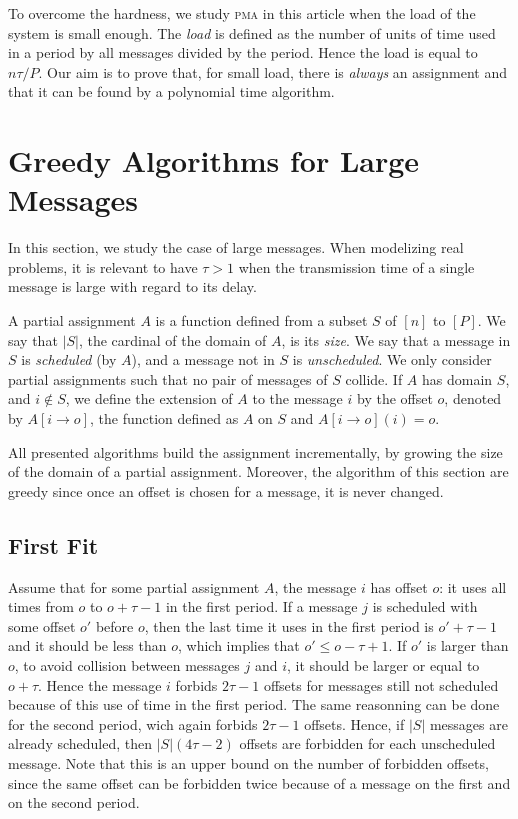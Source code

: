 \documentclass[10pt, conference, letterpaper]{IEEEtran}
\newcommand\pma{\textsc{pma}\xspace}
\begin{document}
To overcome the hardness, we study \pma in this article when the load of the system is small enough. The \emph{load} is defined as the number of units of time used in a period by all messages divided by the period. Hence the load is equal to $n\tau /P$. Our aim is to prove that, for small load, there is \emph{always} an assignment and that it can be found by a polynomial time algorithm.



\section{Greedy Algorithms for Large Messages}

In this section, we study the case of large messages. When modelizing real problems,
it is relevant to have $\tau > 1$ when the transmission time of a single message is large with regard to its delay.


A partial assignment $A$ is a function defined from a subset $S$ of $[n]$ to $[P]$.
We say that $|S|$, the cardinal of the domain of $A$, is its \emph{size}.
We say that a message in $S$ is \emph{scheduled} (by $A$), and a message not in $S$ is \emph{unscheduled}. We only consider partial assignments such that no pair of messages of $S$ collide. If $A$ has domain $S$, and $i \notin S$, we define the extension of $A$ to the message $i$ by the offset $o$, denoted by $A[i \rightarrow o]$, the function defined as $A$ on $S$ and $A[i \rightarrow o](i) = o$.

All presented algorithms build the assignment incrementally, by growing the size of the domain of a partial assignment. Moreover, the algorithm of this section are greedy since once an offset is chosen for a message, it is never changed.


\subsection{First Fit}


Assume that for some partial assignment $A$, the message $i$ has offset $o$: it uses all times from $o$ to $o + \tau -1$ in the first period. If a message $j$ is scheduled with some offset $o'$ before $o$, then the last time it uses in the first period is $o'+\tau-1$ and it should be less than $o$, which implies that $o' \leq o - \tau + 1$. If $o'$ is larger than $o$, to avoid collision between messages $j$ and $i$, it should be larger or equal to $o+ \tau$. Hence the message $i$ forbids $2\tau -1$ offsets for messages still not scheduled because of this use of time in the first period. The same reasonning can be done for the second period, wich again forbids $2\tau -1$ offsets. Hence, if $|S|$ messages are already scheduled, then $|S|(4\tau -2)$ offsets are forbidden for each unscheduled message. Note that this is an upper bound on the number of forbidden offsets, since the same offset can be forbidden twice because of a message on the first and on the second period.
\end{document}
